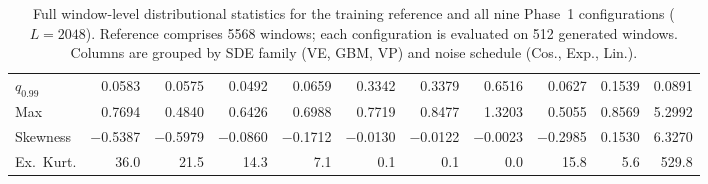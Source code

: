 \begin{table}[hbpt]
\begin{tabular}{
  l
  r                  %
  r r r              %
  r r r              %
  r r r              %
}
$q_{0.99}$  &  0.0583 &  0.0575 &  0.0492 &  0.0659 &  0.3342 &  0.3379 &  0.6516 &  0.0627 &  0.1539 &  0.0891 \\
Max         &  0.7694 &  0.4840 &  0.6426 &  0.6988 &  0.7719 &  0.8477 &  1.3203 &  0.5055 &  0.8569 &  5.2992 \\
Skewness    & $-$0.5387 & $-$0.5979 & $-$0.0860 & $-$0.1712 & $-$0.0130 & $-$0.0122 & $-$0.0023 & $-$0.2985 &  0.1530 &  6.3270 \\
Ex.\ Kurt.  & 36.0 & 21.5 & 14.3 &  7.1 &  0.1 &  0.1 &  0.0 & 15.8 &  5.6 & 529.8 \\
\bottomrule
\end{tabular}
\caption{Full window-level distributional statistics for the training reference and all nine Phase~1 configurations ($L=2048$). Reference comprises 5568 windows; each configuration is evaluated on 512 generated windows. Columns are grouped by SDE family (VE, GBM, VP) and noise schedule (Cos., Exp., Lin.).}
\label{tab:phase1_raw_with_reference}
\end{table}

